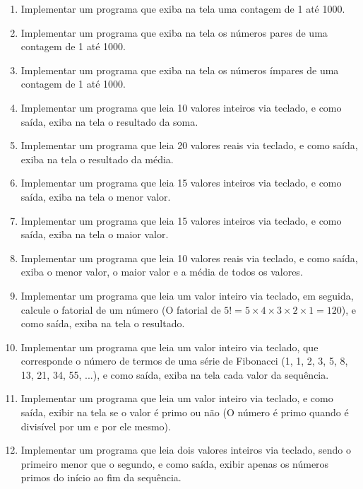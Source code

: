 \documentclass[11pt]{article}
\begin{document}
\begin{enumerate}
	\item  Implementar um programa que exiba na tela uma contagem de 1 até 1000.
	
	\item Implementar um programa que exiba na tela os números pares de uma contagem de 1 até 1000.
	
	\item Implementar um programa que exiba na tela os números ímpares de uma contagem de 1 até
	1000.
	
	\item Implementar um programa que leia 10 valores inteiros via teclado, e como saída, exiba na tela o
	resultado da soma.
	
	\item Implementar um programa que leia 20 valores reais via teclado, e como saída, exiba na tela o
	resultado da média.
	
	\item Implementar um programa que leia 15 valores inteiros via teclado, e como saída, exiba na tela o
	menor valor.
	
	\item  Implementar um programa que leia 15 valores inteiros via teclado, e como saída, exiba na tela o
	maior valor.
	
	\item Implementar um programa que leia 10 valores reais via teclado, e como saída, exiba o menor
	valor, o maior valor e a média de todos os valores.
	
	\item Implementar um programa que leia um valor inteiro via teclado, em seguida, calcule o fatorial de
	um número (O fatorial de $5! = 5 \times 4 \times 3 \times 2 \times 1 = 120$), e como saída, exiba na tela o resultado.
	
	\item  Implementar um programa que leia um valor inteiro via teclado, que corresponde o número de
	termos de uma série de Fibonacci (1, 1, 2, 3, 5, 8, 13, 21, 34, 55, ...), e como saída, exiba na tela
	cada valor da sequência.
	
	\item  Implementar um programa que leia um valor inteiro via teclado, e como saída, exibir na tela se
	o valor é primo ou não (O número é primo quando é divisível por um e por ele mesmo).
	
	\item  Implementar um programa que leia dois valores inteiros via teclado, sendo o primeiro menor que
	o segundo, e como saída, exibir apenas os números primos do início ao fim da sequência.
	

\end{enumerate}
\end{document}
